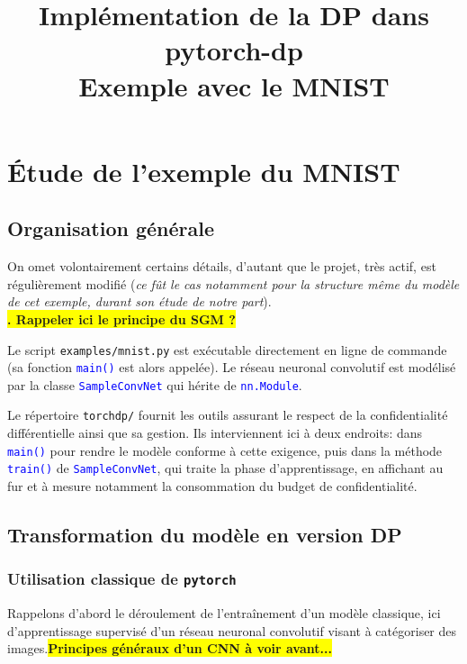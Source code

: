 \documentclass[a4paper,11pt]{article} %
\title{\textbf{Implémentation de la DP dans pytorch-dp\\{\small Exemple avec le MNIST}}}
\author{}
\date{}
\newcommand{\ttt}[1]{\texttt{#1}}
\newcommand{\file}[1]{\colorbox{blue!10}{\texttt{#1}}}
\newcommand{\code}[1]{\textcolor{blue}{\texttt{#1}}}
\newcommand{\rem}[1]{\colorbox{yellow}{\textbf{#1}}}
\newcommand{\REM}[1]{\colorbox{yellow}{\color{red}\textbf{#1}}}
\begin{document}
\maketitle
\tableofcontents
\section{Étude de l'exemple du MNIST}
%
\subsection{Organisation générale}
%
On omet volontairement certains détails, d'autant que le projet, très actif, est régulièrement modifié (\emph{ce fût le cas notamment pour la structure même du modèle de cet exemple, durant son étude de notre part}).
\\\rem{. Rappeler ici le principe du SGM ?}

Le script \file{examples/mnist.py} est exécutable directement en ligne de commande (sa fonction \code{main()} est alors appelée). Le réseau neuronal convolutif est modélisé par la classe \code{SampleConvNet} qui hérite de \code{nn.Module}.

Le répertoire \file{torchdp/} fournit les outils assurant le respect de la confidentialité différentielle ainsi que sa gestion. Ils interviennent ici à deux endroits: dans \code{main()} pour rendre le modèle conforme à cette exigence, puis dans la méthode \code{train()} de \code{SampleConvNet}, qui traite la phase d'apprentissage, en affichant au fur et à mesure notamment la consommation du \og budget de confidentialité\fg{}.
%
\subsection{Transformation du modèle en version DP}
%
\subsubsection{Utilisation classique de \ttt{pytorch}}
%
Rappelons d'abord le déroulement de l'entraînement d'un modèle classique, ici d'apprentissage supervisé d'un réseau neuronal convolutif visant à catégoriser des images.\REM{Principes généraux d'un CNN à voir avant...}
\end{document}
